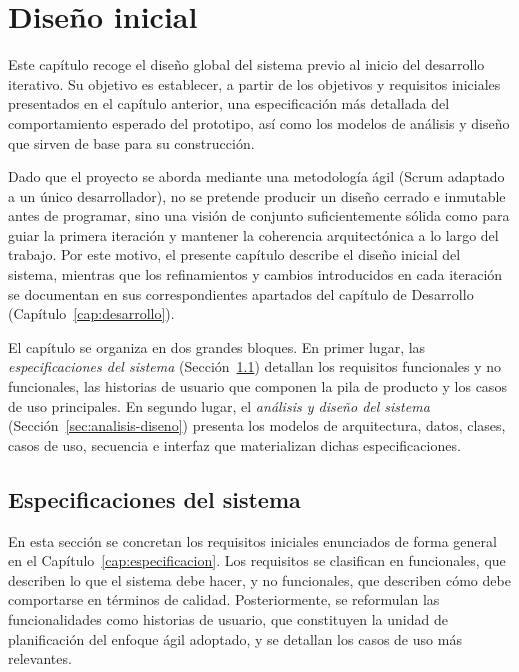 \chapter{Diseño inicial}
\label{cap:diseno-inicial}

Este capítulo recoge el diseño global del sistema previo al inicio del desarrollo iterativo. Su objetivo es establecer, a partir de los objetivos y requisitos iniciales presentados en el capítulo anterior, una especificación más detallada del comportamiento esperado del prototipo, así como los modelos de análisis y diseño que sirven de base para su construcción.

Dado que el proyecto se aborda mediante una metodología ágil (Scrum adaptado a un único desarrollador), no se pretende producir un diseño cerrado e inmutable antes de programar, sino una visión de conjunto suficientemente sólida como para guiar la primera iteración y mantener la coherencia arquitectónica a lo largo del trabajo. Por este motivo, el presente capítulo describe el diseño inicial del sistema, mientras que los refinamientos y cambios introducidos en cada iteración se documentan en sus correspondientes apartados del capítulo de Desarrollo (Capítulo~\ref{cap:desarrollo}).

El capítulo se organiza en dos grandes bloques. En primer lugar, las \textit{especificaciones del sistema} (Sección~\ref{sec:especificaciones-sistema}) detallan los requisitos funcionales y no funcionales, las historias de usuario que componen la pila de producto y los casos de uso principales. En segundo lugar, el \textit{análisis y diseño del sistema} (Sección~\ref{sec:analisis-diseno}) presenta los modelos de arquitectura, datos, clases, casos de uso, secuencia e interfaz que materializan dichas especificaciones.


\section{Especificaciones del sistema}
\label{sec:especificaciones-sistema}

En esta sección se concretan los requisitos iniciales enunciados de forma general en el Capítulo~\ref{cap:especificacion}. Los requisitos se clasifican en funcionales, que describen lo que el sistema debe hacer, y no funcionales, que describen cómo debe comportarse en términos de calidad. Posteriormente, se reformulan las funcionalidades como historias de usuario, que constituyen la unidad de planificación del enfoque ágil adoptado, y se detallan los casos de uso más relevantes.


